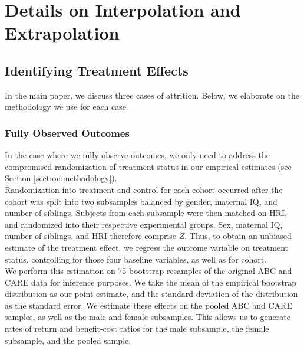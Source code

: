 \section{Details on Interpolation and Extrapolation} \label{appendix:methodology}

\subsection{Identifying Treatment Effects}
\label{app:method_identify}

\noindent In the main paper, we discuss three cases of attrition. Below, we elaborate on the methodology we use for each case. \\

\subsubsection{Fully Observed Outcomes}
\label{app:method_fullobs}

\noindent  In the case where we fully observe outcomes, we only need to address the compromised randomization
of treatment status in our empirical estimates (see Section \ref{section:methodology}). \\

\noindent Randomization into treatment and control for each cohort occurred after the cohort was split
into two subsamples balanced by gender, maternal IQ,
and number of siblings. Subjects from each subsample were then matched on HRI, and randomized
into their respective experimental groups. Sex, maternal IQ, number of siblings, and HRI
therefore comprise $Z$. Thus, to obtain an
unbiased estimate of the treatment effect, we regress the outcome variable on treatment status,
controlling for those four baseline variables, as well as for cohort. \\

\noindent We perform this estimation on 75 bootstrap resamples of the original ABC and CARE data for inference purposes. We take the mean of the empirical bootstrap distribution as our point estimate, and the standard deviation
of the distribution as the standard error. We estimate these effects on the
pooled ABC and CARE samples, as well as the male and female subsamples. This allows us to generate
rates of return and benefit-cost ratios for the male subsample, the female subsample, and the pooled sample. \\


